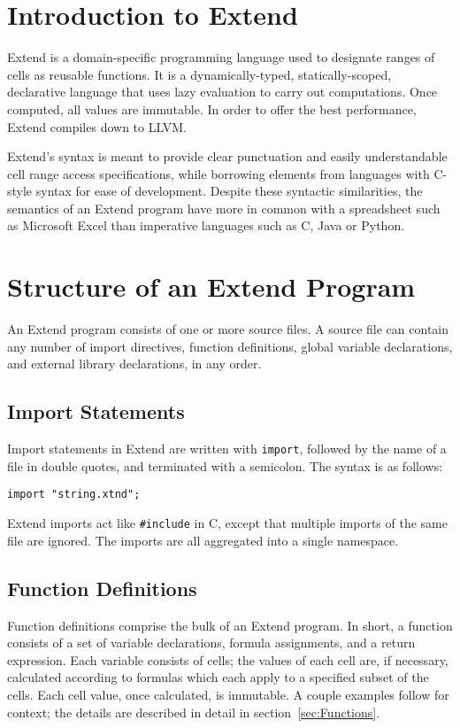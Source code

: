 \section{Introduction to Extend}
	Extend is a domain-specific programming language used to designate ranges of cells as reusable functions. It is a dynamically-typed, statically-scoped, declarative language that uses lazy evaluation to carry out computations. Once computed, all values are immutable. In order to offer the best performance, Extend compiles down to LLVM.

	Extend's syntax is meant to provide clear punctuation and easily understandable cell range access specifications, while borrowing elements from languages with C-style syntax for ease of development. Despite these syntactic similarities, the semantics of an Extend program have more in common with a spreadsheet such as Microsoft Excel than imperative languages such as C, Java or Python.

\section{Structure of an Extend Program}
\label{sec:Grammar}
	An Extend program consists of one or more source files. A source file can contain any number of import directives, function definitions, global variable declarations, and external library declarations, in any order.
	\subsection{Import Statements}
		Import statements in Extend are written with \texttt{import}, followed by the name of a file in double quotes, and terminated with a semicolon. The syntax is as follows:
		\begin{lstlisting}
import "string.xtnd";
		\end{lstlisting}
		Extend imports act like \texttt{\#include} in C, except that multiple imports of the same file are ignored. The imports are all aggregated into a single namespace.
		\subsection{Function Definitions}
			Function definitions comprise the bulk of an Extend program. In short, a function consists of a set of variable declarations, formula assignments, and a return expression. Each variable consists of cells; the values of each cell are, if necessary, calculated according to formulas which each apply to a specified subset of the cells. Each cell value, once calculated, is immutable. A couple examples follow for context; the details are described in detail in section~\ref{sec:Functions}.
			
